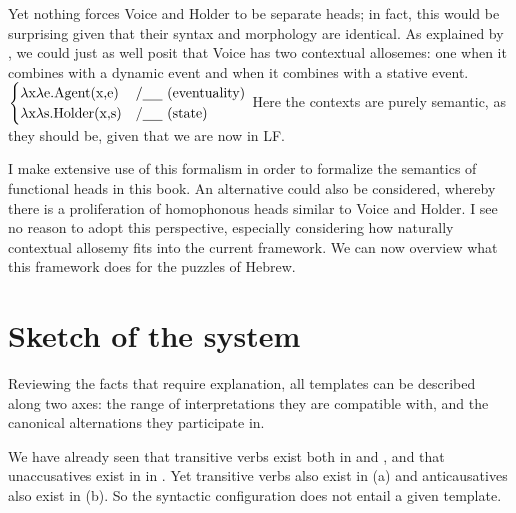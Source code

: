 Yet nothing forces Voice and Holder to be separate heads; in fact, this would be surprising given that their syntax and morphology are identical. As explained by \cite{wood15springer}, we could just as well posit that Voice has two contextual allosemes: one when it combines with a dynamic event and when it combines with a stative event.
\ex {} \lra~ $\begin{cases}
	\lambda\text{x}\lambda\text{e.Agent(x,e)} & / \trace~ \text{(eventuality)} \\
	\lambda\text{x}\lambda\text{s.Holder(x,s)} & / \trace~ \text{(state)} \\
	\end{cases}$ 
\xe
Here the contexts are purely semantic, as they should be, given that we are now in LF.

I make extensive use of this formalism in order to formalize the semantics of functional heads in this book. An alternative could also be considered, whereby there is a proliferation of homophonous heads similar to Voice and Holder. I see no reason to adopt this perspective, especially considering how naturally contextual allosemy fits into the current framework. We can now overview what this framework does for the puzzles of Hebrew.


\section{Sketch of the system} \label{intro:sketch}
Reviewing the facts that require explanation, all templates can be described along two axes: the range of interpretations they are compatible with, and the canonical alternations they participate in.

We have already seen that transitive verbs exist both in {\tkal} and {\thif}, and that unaccusatives exist in in {\tnif}. Yet transitive verbs also exist in {\tpie} (\nextx a) and anticausatives also exist in {\thit} (\nextx b). So the syntactic configuration does not entail a given template.
\ex\label{ex:counter1}
\xe

